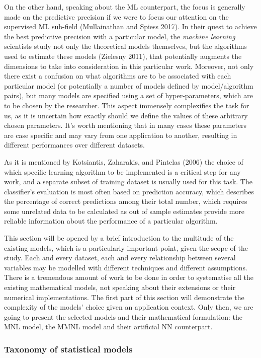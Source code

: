 \documentclass[11pt,]{article}
\begin{document}
On the other hand, speaking about the ML counterpart, the focus is
generally made on the predictive precision if we were to focus our
attention on the supervised ML sub-field (Mullainathan and Spiess 2017).
In their quest to achieve the best predictive precision with a
particular model, the \emph{machine learning} scientists study not only
the theoretical models themselves, but the algorithms used to estimate
these models (Zielesny 2011), that potentially augments the dimensions
to take into consideration in this particular work. Moreover, not only
there exist a confusion on what algorithms are to be associated with
each particular model (or potentially a number of models defined by
model/algorithm pairs), but many models are specified using a set of
hyper-parameters, which are to be chosen by the researcher. This aspect
immensely complexifies the task for us, as it is uncertain how exactly
should we define the values of these arbitrary chosen parameters. It's
worth mentioning that in many cases these parameters are case specific
and may vary from one application to another, resulting in different
performances over different datasets.

As it is mentioned by Kotsiantis, Zaharakis, and Pintelas (2006) the
choice of which specific learning algorithm to be implemented is a
critical step for any work, and a separate subset of training dataset is
usually used for this task. The classifier's evaluation is most often
based on prediction accuracy, which describes the percentage of correct
predictions among their total number, which requires some unrelated data
to be calculated as out of sample estimates provide more reliable
information about the performance of a particular algorithm.

This section will be opened by a brief introduction to the multitude of
the existing models, which is a particularly important point, given the
scope of the study. Each and every dataset, each and every relationship
between several variables may be modelled with different techniques and
different assumptions. There is a tremendous amount of work to be done
in order to systematise all the existing mathematical models, not
speaking about their extensions or their numerical implementations. The
first part of this section will demonstrate the complexity of the
models' choice given an application context. Only then, we are going to
present the selected models and their mathematical formulation: the MNL
model, the MMNL model and their artificial NN counterpart.

\hypertarget{taxonomy-of-statistical-models}{%
\subsubsection{Taxonomy of statistical
models}\label{taxonomy-of-statistical-models}}
\end{document}
